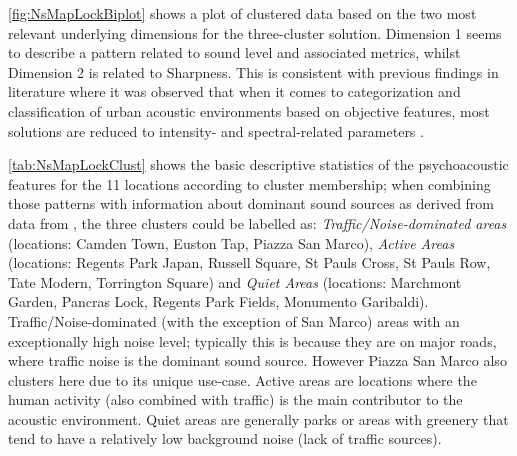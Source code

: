 
\cref{fig:NsMapLockBiplot} shows a plot of clustered data based on the two most relevant underlying dimensions for the three-cluster solution. Dimension 1 seems to describe a pattern related to sound level and associated metrics, whilst Dimension 2 is related to Sharpness. This is consistent with previous findings in literature where it was observed that when it comes to categorization and classification of urban acoustic environments based on objective features, most solutions are reduced to intensity- and spectral-related parameters \citep{deCoensel2006quiet,Aletta2017Dimensions}.

\cref{tab:NsMapLockClust} shows the basic descriptive statistics of the psychoacoustic features for the 11 locations according to cluster membership; when combining those patterns with information about dominant sound sources as derived from data from \citet{Mitchell2020Soundscape}, the three clusters could be labelled as: \emph{Traffic/Noise-dominated areas} (locations: Camden Town, Euston Tap, Piazza San Marco), \emph{Active Areas} (locations: Regents Park Japan, Russell Square, St Pauls Cross, St Pauls Row, Tate Modern, Torrington Square) and \emph{Quiet Areas} (locations: Marchmont Garden, Pancras Lock, Regents Park Fields, Monumento Garibaldi). Traffic/Noise-dominated (with the exception of San Marco) areas with an exceptionally high noise level; typically this is because they are on major roads, where traffic noise is the dominant sound source. However Piazza San Marco also clusters here due to its unique use-case. Active areas are locations where the human activity (also combined with traffic) is the main contributor to the acoustic environment. Quiet areas are generally parks or areas with greenery that tend to have a relatively low background noise (lack of traffic sources).

